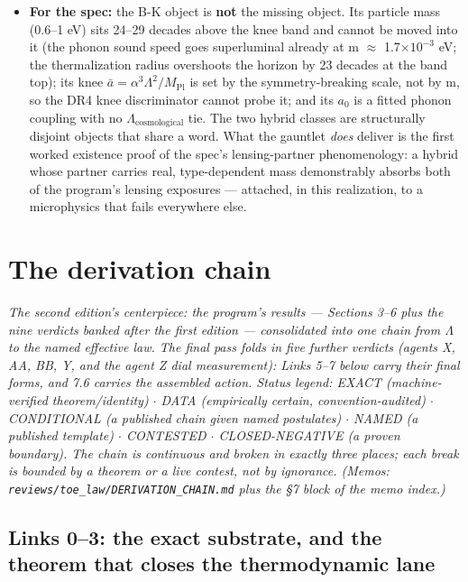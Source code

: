 \documentclass[11pt,a4paper]{article}
\begin{document}
\begin{itemize}
\item \textbf{For the spec:} the B-K object is \textbf{not} the missing object. Its particle mass (0.6--1 eV) sits 24--29 decades above the knee band and cannot be moved into it (the phonon sound speed goes superluminal already at m $\approx$ 1.7$\times10^{-3}$ eV; the thermalization radius overshoots the horizon by 23 decades at the band top); its knee $\bar a = \alpha^3\Lambda^2/M_{\mathrm{Pl}}$ is set by the symmetry-breaking scale, not by m, so the DR4 knee discriminator cannot probe it; and its $a_{0}$ is a fitted phonon coupling with no $\Lambda_{\mathrm{cosmological}}$ tie. The two hybrid classes are structurally disjoint objects that share a word. What the gauntlet \emph{does} deliver is the first worked existence proof of the spec's lensing-partner phenomenology: a hybrid whose partner carries real, type-dependent mass demonstrably absorbs both of the program's lensing exposures --- attached, in this realization, to a microphysics that fails everywhere else.

\end{itemize}

\section{The derivation chain}

\emph{The second edition's centerpiece: the program's results --- Sections 3--6 plus the nine verdicts banked after the first edition --- consolidated into one chain from $\Lambda$ to the named effective law. The final pass folds in five further verdicts (agents X, AA, BB, Y, and the agent Z dial measurement): Links 5--7 below carry their final forms, and 7.6 carries the assembled action. Status legend: EXACT (machine-verified theorem/identity) $\cdot$ DATA (empirically certain, convention-audited) $\cdot$ CONDITIONAL (a published chain given named postulates) $\cdot$ NAMED (a published template) $\cdot$ CONTESTED $\cdot$ CLOSED-NEGATIVE (a proven boundary). The chain is continuous and broken in exactly three places; each break is bounded by a theorem or a live contest, not by ignorance. (Memos: \texttt{reviews/\allowbreak{}toe\_\allowbreak{}law/\allowbreak{}DERIVATION\_\allowbreak{}CHAIN.md} plus the \S{}7 block of the memo index.)}

\subsection{Links 0--3: the exact substrate, and the theorem that closes the thermodynamic lane}
\end{document}
